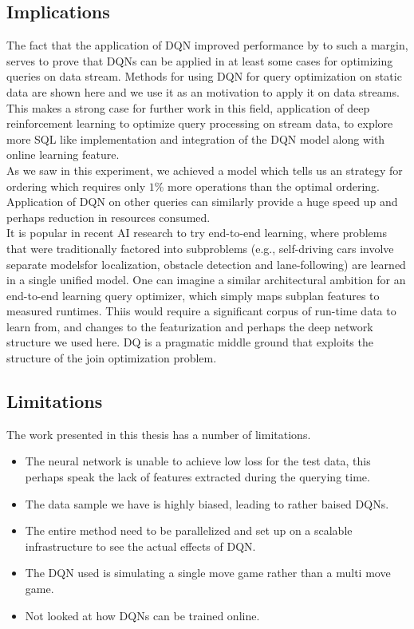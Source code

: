 \subsection{Implications}
The fact that the application of DQN improved performance by to such a margin, serves to prove that DQNs can be applied in at least some cases for optimizing queries on data stream. Methods for using DQN for query optimization on static data are shown here \cite{drl_dbms} and we use it as an motivation to apply it on data streams.  \\
This makes a strong case for further work in this field, application of deep reinforcement learning to optimize query processing on stream data, to explore more SQL like implementation and integration of the DQN model along with online learning feature.\\
As we saw in this experiment, we achieved a model which tells us an strategy for ordering which requires only $1\%$ more operations than the optimal ordering. Application of DQN on other queries can similarly provide a huge speed up and perhaps reduction in resources consumed. \\
It is popular in recent AI research to try end-to-end learning, where problems that were traditionally factored into subproblems (e.g., self-driving cars involve separate modelsfor localization, obstacle detection and lane-following) are learned in a single unified model. One can imagine a similar architectural ambition for an end-to-end learning query optimizer, which simply maps subplan features to measured runtimes. Thiis would require a significant corpus of run-time data to learn from, and changes to the featurization and perhaps the deep network structure we used here. DQ is a pragmatic middle ground that exploits the structure of the join optimization problem\cite{drl_dbms}.

\subsection{Limitations}
The work presented in this thesis has a number of limitations.
\begin{itemize}
    \item The neural network is unable to achieve low loss for the test data, this perhaps speak the lack of features extracted during the querying time.
    \item The data sample we have is highly biased, leading to rather baised DQNs.
    \item The entire method need to be parallelized and set up on a scalable infrastructure to see the actual effects of DQN.
    \item The DQN used is simulating a single move game rather than a multi move game.
    \item Not looked at how DQNs can be trained online.
\end{itemize}


